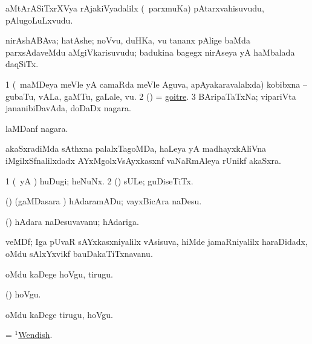 \bentry
{} 
\gl{\nA}
\expl{\G}
\bmng
aMtArASiTxrXVya rAjakiVyadalilx (\kanmu\ parxmuKa) pAtarxvahisuvudu, pAlugoLuLxvudu. 
\emng
\eentry

\bentry 
{} 
\gl{\nA}
\expl{\G}
\bmng
nirAshABAva; hatAshe; noVvu, duHKa, \mo vu tananx pAlige baMda parxsAdaveMdu aMgiVkarisuvudu; badukina bagegx nirAseya yA haMbalada daqSiTx. 
\emng
\eentry

\bentry
{} 
\gl{\nA}
\expl{}
\bmng
\bnum
\num{1} (\kanmu\ maMDeya meVle yA camaRda meVle Aguva, apAyakaravalalxda) kobibxna -- gubaTu, vALa, gaMTu, gaLale, \mo vu. 
\num{2} (\pArxparx) = \hyperref{kandict_g.pdf}{G}{goitre}{goitre}. 
\num{3} BAripaTaTxNa; vipariVta jananibiDavAda, doDaDx nagara. 
\enum
\emng

\noindent 
\gl{\pagu}
\expl{}
\bmng
{} laMDanf nagara. 
\emng
\eentry

\bentry
{} 
\gl{\nA}
\expl{}
\bmng
{} akaSxradiMda sAthxna palalxTagoMDa, haLeya yA madhayxkAliVna iMgilxSfnalilxdadx AYxMgolxVsAyxkasxnf vaNaRmAleya rUnikf akaSxra. 
\emng
\eentry

\bentry
{} 
\gl{\nA}
\expl{}
\bmng
\bnum
\num{1} (\AmA\ yA \hA) huDugi; heNuNx. 
\num{2} (\pArxparx) sULe; guDiseTiTx. 
\enum
\emng
\eentry

\bentry
{} 
\gl{\akirx}
\expl{}
\bmng
(\pArxparx) (gaMDasara \vi) hAdaramADu; vayxBicAra naDesu. 
\emng
\eentry

\bentry
{} 
\gl{\nA}
\expl{}
\bmng
(\pArxparx) hAdara naDesuvavanu; hAdariga. 
\emng
\eentry

\bentry
{} 
\gl{\nA}
\expl{}
\bmng
veMDf; Iga pUvaR sAYxkasxniyalilx vAsisuva, hiMde \kanu jamaRniyalilx haraDidadx, oMdu sAlxYxvikf bauDakaTiTxnavanu. 
\emng
\eentry

\bentry
{} 
\gl{\sakirx}
\expl{}
\bmng
oMdu kaDege hoVgu, tirugu. 
\emng

\noindent 
\gl{\akirx}
\expl{}
\bmng
(\pArxparx) hoVgu. 
\emng

\noindent 
\gl{\pagu}
\expl{}
\bmng
{} oMdu kaDege tirugu, hoVgu. 
\emng
\eentry

\bentry
{} 
\gl{\gu}
\expl{}
\bmng
= \hyperlink{Wendish(1)}{$^1$Wendish}. 
\emng
\eentry


